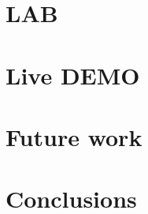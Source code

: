 \documentclass[10pt]{beamer}
\begin{document}
\section {LAB}
\section {Live DEMO}
\section {Future work}
\section {Conclusions}



\end{document}

